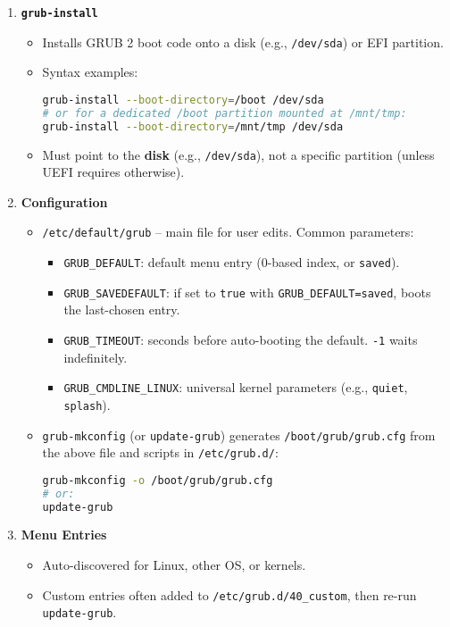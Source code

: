 \documentclass[a4paper]{report}
\begin{document}
\begin{enumerate}
    \item \textbf{\texttt{grub-install}}
    \begin{itemize}
        \item Installs GRUB 2 boot code onto a disk (e.g., \texttt{/dev/sda}) or EFI partition.
        \item Syntax examples:
        \begin{lstlisting}[language=bash]
grub-install --boot-directory=/boot /dev/sda
# or for a dedicated /boot partition mounted at /mnt/tmp:
grub-install --boot-directory=/mnt/tmp /dev/sda
        \end{lstlisting}
        \item Must point to the \textbf{disk} (e.g., \texttt{/dev/sda}), not a specific partition (unless UEFI requires otherwise).
    \end{itemize}

    \item \textbf{Configuration}
    \begin{itemize}
        \item \texttt{/etc/default/grub} – main file for user edits. Common parameters:
        \begin{itemize}
            \item \texttt{GRUB\_DEFAULT}: default menu entry (0-based index, or \texttt{saved}).
            \item \texttt{GRUB\_SAVEDEFAULT}: if set to \texttt{true} with \texttt{GRUB\_DEFAULT=saved}, boots the last-chosen entry.
            \item \texttt{GRUB\_TIMEOUT}: seconds before auto-booting the default. \texttt{-1} waits indefinitely.
            \item \texttt{GRUB\_CMDLINE\_LINUX}: universal kernel parameters (e.g., \texttt{quiet}, \texttt{splash}).
        \end{itemize}
        \item \texttt{grub-mkconfig} (or \texttt{update-grub}) generates \texttt{/boot/grub/grub.cfg} from the above file and scripts in \texttt{/etc/grub.d/}:
        \begin{lstlisting}[language=bash]
grub-mkconfig -o /boot/grub/grub.cfg
# or:
update-grub
        \end{lstlisting}
    \end{itemize}

    \item \textbf{Menu Entries}
    \begin{itemize}
        \item Auto-discovered for Linux, other OS, or kernels.
        \item Custom entries often added to \texttt{/etc/grub.d/40\_custom}, then re-run \texttt{update-grub}.
    \end{itemize}


\end{enumerate}
\end{document}
